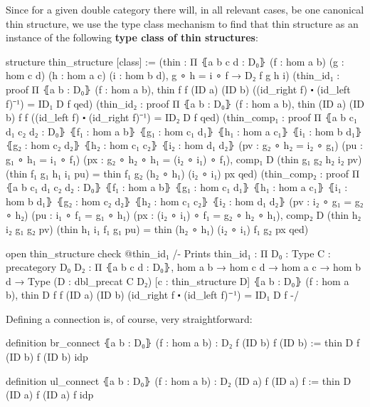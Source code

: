 Since for a given double category there will, in all relevant cases, be one
canonical thin structure, we use the type class mechanism to find that thin
structure as an instance of the following \textbf{type class of thin structures}:
\begin{leancodebr}
structure thin_structure [class] :=
  (thin : Π ⦃a b c d : D₀⦄
    (f : hom a b) (g : hom c d) (h : hom a c) (i : hom b d), g ∘ h = i ∘ f
    → D₂ f g h i)
  (thin_id₁ : proof Π ⦃a b : D₀⦄ (f : hom a b),
    thin f f (ID a) (ID b) ((id_right f) ⬝ (id_left f)⁻¹) = ID₁ D f qed)
  (thin_id₂ : proof Π ⦃a b : D₀⦄ (f : hom a b),
    thin (ID a) (ID b) f f ((id_left f) ⬝ (id_right f)⁻¹) = ID₂ D f qed)
  (thin_comp₁ : proof Π ⦃a b c₁ d₁ c₂ d₂ : D₀⦄
    ⦃f₁ : hom a b⦄ ⦃g₁ : hom c₁ d₁⦄ ⦃h₁ : hom a c₁⦄ ⦃i₁ : hom b d₁⦄
    ⦃g₂ : hom c₂ d₂⦄ ⦃h₂ : hom c₁ c₂⦄ ⦃i₂ : hom d₁ d₂⦄
    (pv : g₂ ∘ h₂ = i₂ ∘ g₁) (pu : g₁ ∘ h₁ = i₁ ∘ f₁)
    (px : g₂ ∘ h₂ ∘ h₁ = (i₂ ∘ i₁) ∘ f₁),
    comp₁ D (thin g₁ g₂ h₂ i₂ pv) (thin f₁ g₁ h₁ i₁ pu)
    = thin f₁ g₂ (h₂ ∘ h₁) (i₂ ∘ i₁) px qed)
  (thin_comp₂ : proof Π ⦃a b c₁ d₁ c₂ d₂ : D₀⦄
    ⦃f₁ : hom a b⦄ ⦃g₁ : hom c₁ d₁⦄ ⦃h₁ : hom a c₁⦄ ⦃i₁ : hom b d₁⦄
    ⦃g₂ : hom c₂ d₂⦄ ⦃h₂ : hom c₁ c₂⦄ ⦃i₂ : hom d₁ d₂⦄
    (pv : i₂ ∘ g₁ = g₂ ∘ h₂) (pu : i₁ ∘ f₁ = g₁ ∘ h₁)
    (px : (i₂ ∘ i₁) ∘ f₁ = g₂ ∘ h₂ ∘ h₁),
    comp₂ D (thin h₂ i₂ g₁ g₂ pv) (thin h₁ i₁ f₁ g₁ pu)
    = thin (h₂ ∘ h₁) (i₂ ∘ i₁) f₁ g₂ px qed)

open thin_structure
check @thin_id₁ /- Prints
  thin_id₁ :
  Π {D₀ : Type} {C : precategory D₀}
    {D₂ : Π ⦃a b c d : D₀⦄, hom a b → hom c d → hom a c → hom b d → Type}
    (D : dbl_precat C D₂) [c : thin_structure D] ⦃a b : D₀⦄ (f : hom a b),
        thin D f f (ID a) (ID b) (id_right f ⬝ (id_left f)⁻¹) = ID₁ D f -/
\end{leancodebr}

Defining a connection is, of course, very straightforward:
\begin{leancode}
definition br_connect ⦃a b : D₀⦄ (f : hom a b) : D₂ f (ID b) f (ID b) :=
thin D f (ID b) f (ID b) idp

definition ul_connect ⦃a b : D₀⦄ (f : hom a b) : D₂ (ID a) f (ID a) f :=
thin D (ID a) f (ID a) f idp
\end{leancode}

